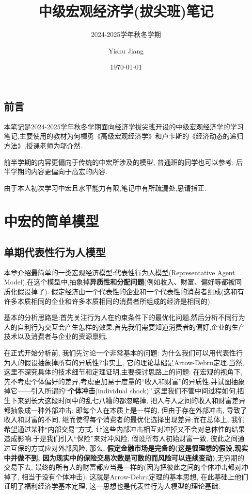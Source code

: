 \documentclass[lang=cn,10pt]{elegantbook}
\title{中级宏观经济学(拔尖班)笔记}
\subtitle{2024-2025学年秋冬学期}
\author{Yishu Jiang}
\institute{School of Economics,Zhejiang University}
\date{\today}
\begin{document}
\maketitle
\frontmatter
\chapter*{前言}
{\fangsong 
    本笔记是2024-2025学年秋冬学期面向经济学拔尖班开设的中级宏观经济学的学习笔记,主要使用的教材为何樟勇《高级宏观经济学》和卢卡斯的《经济动态的递归方法》,授课老师为邬介然.
    
    前半学期的内容更偏向于传统的中宏所涉及的模型, 普通班的同学也可以参考; 后半学期的内容更偏向于高宏的内容.

    由于本人初次学习中宏且水平能力有限,笔记中有所疏漏处,恳请指正.
}
\newpage

\tableofcontents

\mainmatter
\part{中宏的简单模型}
\chapter{单期代表性行为人模型}
本章介绍最简单的一类宏观经济模型:代表性行为人模型(Representative Agent Model),在这个模型中,抽象掉\textbf{异质性和分配问题}(例如收入、财富、偏好等都被同质化假设掉了).
假定经济由一个代表性的企业和一个代表性的消费者组成(这和有许多本质相同的企业和许多本质相同的消费者所组成的经济是相同的).

基本的分析思路是:首先关注行为人在约束条件下的最优化问题,然后分析不同行为人的自利行为交互会产生怎样的效果.首先我们需要知道消费者的偏好,企业的生产技术以及消费者与企业的资源禀赋.

{\kaishu 在正式开始分析前, 我们先讨论一个非常基本的问题: 为什么我们可以用代表性行为人的假设抽象掉所有的异质性?事实上, 它的理论基础是Arrow-Debru定理.当然,这里不深究具体的技术细节和定理证明,主要探讨思路上的问题:
在宏观的视角下,先不考虑个体偏好的差异,考虑更加易于度量的“收入和财富”的异质性,并试图抽象掉它——引入所谓的}“\textbf{个体冲击}(individual shock)”,{\kaishu 这里我们不管中间过程如何,把生下来到长大这段时间中的乱七八糟的都忽略掉, 把人与人之间的收入和财富差异都抽象成一种外部冲击: 即每个人在本质上是一样的, 但由于存在外部冲击, 
导致了收入和财富的不同, 继而使得每个消费者的最优化选择出现差异;而在总体上, 我们希望通过某种“内部交易”方式, 让这些内部冲击相互对冲掉又不会对总体性的结果造成影响.于是我们引入“保险”来对冲风险, 假设所有人初始财富一致, 彼此之间通过互保的方式应对外部风险, 那么, }\textbf{假定金融市场是完备的(这是很理想的假设,现实中并做不到, 因为现实中的保险交易次数是可数的而风险可以连续变动)},{\kaishu 无穷期的交易下去, 最终的所有人的财富都应当是一样的(因为把彼此之间的个体冲击都对冲掉了, 相当于没有个体冲击).
这就是Arrow-Debru定理的基本思想, 在此基础上他们证明了福利经济学基本定理, 这一思想也是代表性行为人模型的理论基础.} 
\newpage
\end{document}
